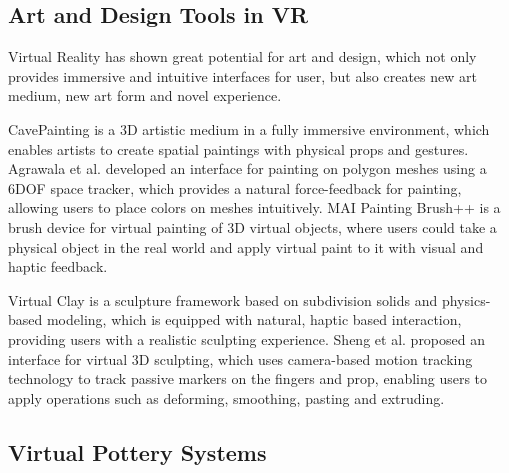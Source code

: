 \documentclass{svjour3}                     %
\begin{document}
\subsection{Art and Design Tools in VR}
\label{sec:2.2}
Virtual Reality has shown great potential for art and design, which not only provides immersive and intuitive interfaces for user, but also creates new art medium, new art form and novel experience\cite{laviola20113d}.

CavePainting \cite{keefe2001cavepainting} is a 3D artistic medium in a fully immersive environment, which enables artists to create spatial paintings with physical props and gestures. Agrawala et al.\cite{agrawala19953d} developed an interface for painting on polygon meshes using a 6DOF space tracker, which provides a natural force-feedback for painting, allowing users to place colors on meshes intuitively. MAI Painting Brush++ \cite{otsuki2017brush} is a brush device for virtual painting of 3D virtual objects, where users could take a physical object in the real world and apply virtual paint to it with visual and haptic feedback.

Virtual Clay \cite{mcdonnell2001virtual} is a sculpture framework based on subdivision solids and physics-based modeling, which is equipped with natural, haptic based interaction, providing users with a realistic sculpting experience. Sheng et al. \cite{sheng2006interface} proposed an interface for virtual 3D sculpting, which uses camera-based motion tracking technology to track passive markers on the fingers and prop, enabling users to apply operations such as deforming, smoothing, pasting and extruding.

\subsection{Virtual Pottery Systems}
\label{sec:2.3}

\end{document}
